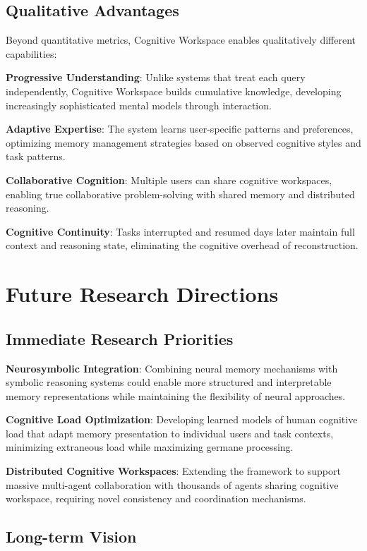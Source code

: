 \documentclass[10pt,twocolumn]{article}
\begin{document}
\subsection{Qualitative Advantages}

Beyond quantitative metrics, Cognitive Workspace enables qualitatively different capabilities:

\textbf{Progressive Understanding}: Unlike systems that treat each query independently, Cognitive Workspace builds cumulative knowledge, developing increasingly sophisticated mental models through interaction.

\textbf{Adaptive Expertise}: The system learns user-specific patterns and preferences, optimizing memory management strategies based on observed cognitive styles and task patterns.

\textbf{Collaborative Cognition}: Multiple users can share cognitive workspaces, enabling true collaborative problem-solving with shared memory and distributed reasoning.

\textbf{Cognitive Continuity}: Tasks interrupted and resumed days later maintain full context and reasoning state, eliminating the cognitive overhead of reconstruction.

\section{Future Research Directions}

\subsection{Immediate Research Priorities}

\textbf{Neurosymbolic Integration}: Combining neural memory mechanisms with symbolic reasoning systems could enable more structured and interpretable memory representations \cite{garcez2019neural} while maintaining the flexibility of neural approaches.

\textbf{Cognitive Load Optimization}: Developing learned models of human cognitive load that adapt memory presentation to individual users and task contexts, minimizing extraneous load while maximizing germane processing.

\textbf{Distributed Cognitive Workspaces}: Extending the framework to support massive multi-agent collaboration with thousands of agents sharing cognitive workspace, requiring novel consistency and coordination mechanisms.

\subsection{Long-term Vision}
\end{document}
